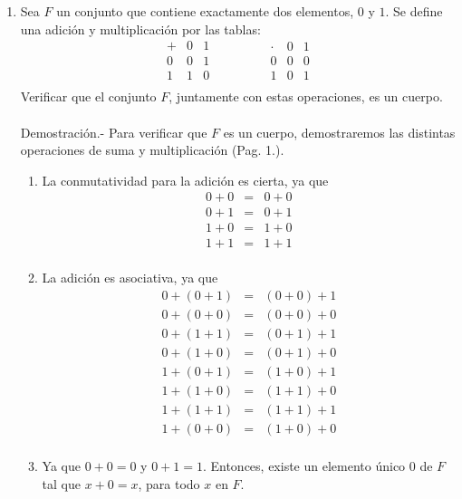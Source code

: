 \begin{enumerate}[\bfseries 1.]
    \item Sea $F$ un conjunto que contiene exactamente dos elementos, $0$ y $1$. Se define una adición y multiplicación por las tablas:
    $$\begin{array}{c|cc}
	+ & 0 & 1 \\
	\hline
	0 & 0 & 1 \\
	1 & 1 & 0 \\
    \end{array} \qquad \qquad 
    \begin{array}{c|cc}
	\cdot & 0 & 1 \\
	\hline
	0 & 0 & 0 \\
	1 & 0 & 1 \\
    \end{array}$$
    Verificar que el conjunto $F$, juntamente con estas operaciones, es un cuerpo.\\\\
	Demostración.-\; Para verificar que $F$ es un cuerpo, demostraremos las distintas operaciones de suma y multiplicación (Pag. 1.).
	\begin{enumerate}[\scriptsize 1.]
	    \item La conmutatividad para la adición es cierta, ya que
		$$\begin{array}{rcl}
		    0+0 &=& 0+0\\
		    0+1 &=& 0+1\\
		    1+0 &=& 1+0\\
		    1+1 &=& 1+1\\
		\end{array}$$

	    \item La adición es asociativa, ya que 
		$$\begin{array}{rcl}
		    0+(0+1) &=& (0+0)+1\\
		    0+(0+0) &=& (0+0)+0\\
		    0+(1+1) &=& (0+1)+1\\
		    0+(1+0) &=& (0+1)+0\\
		    1+(0+1) &=& (1+0)+1\\
		    1+(1+0) &=& (1+1)+0\\
		    1+(1+1) &=& (1+1)+1\\
		    1+(0+0) &=& (1+0)+0\\
		\end{array}$$

	    \item Ya que $0+0=0$ y $0+1=1$. Entonces, existe un elemento único $0$ de $F$ tal que $x+0=x$, para todo $x$ en $F$.


\end{enumerate}
\end{enumerate}
